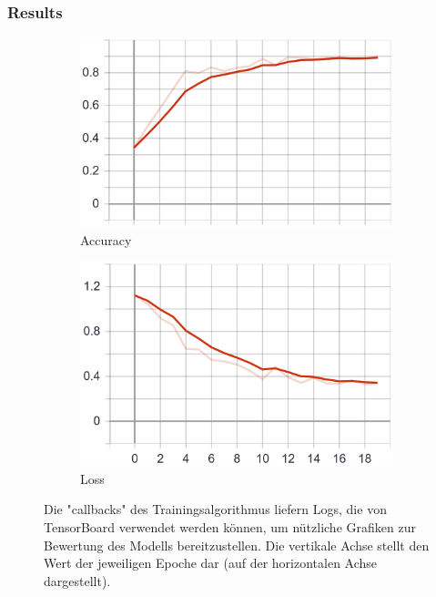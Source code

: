 \subsubsection{Results}
\begin{figure}
    \centering
    \begin{subfigure}[b]{0.4\textwidth}
        \includegraphics[width=\textwidth]{images/first_model_acc.png}
        \caption{Accuracy}
        \label{fig:first_model_acc}
    \end{subfigure}
    \begin{subfigure}[b]{0.4\textwidth}
        \includegraphics[width=\textwidth]{images/first_model_loss.png}
        \caption{Loss}
        \label{fig:first_model_loss}
    \end{subfigure}
    \caption[Training des ersten Modells]{Die "callbacks" des Trainingsalgorithmus liefern Logs, die von TensorBoard verwendet werden können, um nützliche Grafiken zur Bewertung des Modells bereitzustellen. Die vertikale Achse stellt den Wert der jeweiligen Epoche dar (auf der horizontalen Achse dargestellt).}
    \label{fig:first_model_graphs}
\end{figure}

